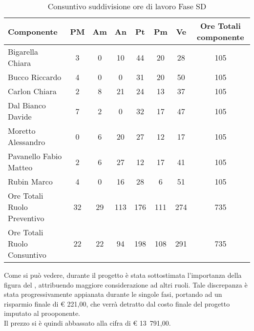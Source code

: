 	\begin{table}[H]
				\begin{center}
					\begin{tabular}{| l | c | c | c | c | c | c | c |}
						\hline
						Componente 					& PM	& Am	& An 		& Pt 		& Pm 	& Ve 	& Ore Totali componente \\ \hline
						
						Bigarella Chiara 			& 3		& 0		& 10 		& 44 		& 20		& 28 		& 105 \\
						Bucco Riccardo 				& 4& 0		& 0			& 31 	& 20		& 50 		& 105 \\
						Carlon Chiara				& 2		& 8 & 21 		& 24			& 13		& 37	& 105 \\
						Dal Bianco Davide 			& 7		& 2 & 0			& 32 		& 17		& 47	& 105 \\
						Moretto Alessandro 			& 0		& 6 	& 20 		& 27 		& 12		& 17 		& 105 \\
						Pavanello Fabio Matteo		& 2		& 6 & 27	& 12	& 17		& 41	& 105 \\
						Rubin Marco					& 4 	& 0		& 16 		& 28			& 6		& 51	& 105 \\ \hline \hline
						
						Ore Totali Ruolo Preventivo	& 32 	& 29 	& 113 		& 176 		& 111		& 274		& 735\\ 
						Ore Totali Ruolo Consuntivo	& 22 	& 22 	& 94 		& 198 		& 108		& 291		& 735\\ \hline
					\end{tabular}
				\end{center}
				\caption{Consuntivo suddivisione ore di lavoro Fase SD}
			\end{table}
	
		Come si può vedere, durante il progetto è stata sottostimata l'importanza della figura del , attribuendo maggiore considerazione ad altri ruoli. Tale discrepanza è stata progressivamente appianata durante le singole fasi, portando ad un risparmio finale di \euro{} 221,00, che verrà detratto dal costo finale del progetto imputato al prooponente.\\
		Il prezzo si è quindi abbassato alla cifra di \euro{} 13~791,00.